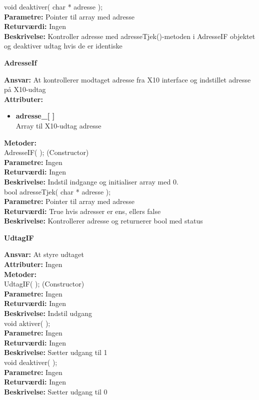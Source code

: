 void deaktiver( char * adresse ); \\
\textbf{Parametre:} Pointer til array med adresse \\
\textbf{Returværdi:} Ingen \\
\textbf{Beskrivelse:} Kontroller adresse med adresseTjek()-metoden i AdresseIF objektet og deaktiver udtag hvis de er identiske \\

%
%
{\centering
\textbf{AdresseIf}\par
}
\textbf{Ansvar:} At kontrollerer modtaget adresse fra X10 interface og indstillet adresse på X10-udtag \\
\textbf{Attributer:}
\begin{itemize}
	\item \textbf{adresse\_[ ]} \\
	Array til X10-udtag adresse
\end{itemize}
\textbf{Metoder:} \\
AdresseIF( ); (Constructor) \\
\textbf{Parametre:} Ingen \\
\textbf{Returværdi:} Ingen \\
\textbf{Beskrivelse:} Indstil indgange og initialiser array med 0. \\

bool adresseTjek( char * adresse ); \\
\textbf{Parametre:} Pointer til array med adresse \\
\textbf{Returværdi:} True hvis adresser er ens, ellers false \\
\textbf{Beskrivelse:} Kontrollerer adresse og returnerer bool med status \\


%
%
{\centering
\textbf{UdtagIF}\par
}
\textbf{Ansvar:} At styre udtaget \\
\textbf{Attributer:} Ingen \\
\textbf{Metoder:} \\
UdtagIF( ); (Constructor) \\
\textbf{Parametre:} Ingen \\
\textbf{Returværdi:} Ingen \\
\textbf{Beskrivelse:} Indstil udgang \\

void aktiver( ); \\
\textbf{Parametre:} Ingen \\
\textbf{Returværdi:} Ingen \\
\textbf{Beskrivelse:} Sætter udgang til 1 \\

void deaktiver( ); \\
\textbf{Parametre:} Ingen \\
\textbf{Returværdi:} Ingen \\
\textbf{Beskrivelse:} Sætter udgang til 0 \\
